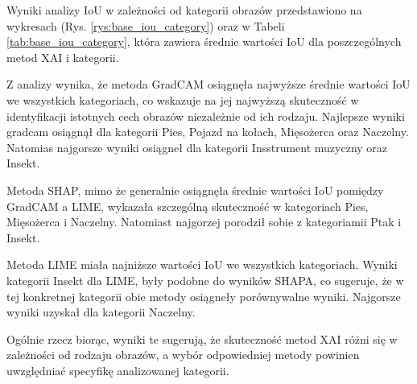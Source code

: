 Wyniki analizy IoU w zależności od kategorii obrazów przedstawiono na wykresach (Rys. \ref{rys:base_iou_category}) oraz w Tabeli \ref{tab:base_iou_category}, która zawiera średnie wartości IoU dla poszczególnych metod XAI i kategorii.

Z analizy wynika, że metoda GradCAM osiągnęła najwyższe średnie wartości IoU we wszystkich kategoriach, co wskazuje na jej najwyższą skuteczność w identyfikacji istotnych cech obrazów niezależnie od ich rodzaju.
Najlepsze wyniki gradcam osiągnął dla kategorii Pies, Pojazd na kołach, Mięsożerca oraz Naczelny.
Natomias najgorsze wyniki osiągneł dla kategorii Insstrument muzyczny oraz Insekt.

Metoda SHAP, mimo że generalnie osiągnęła średnie wartości IoU pomiędzy GradCAM a LIME, wykazała szczególną skuteczność w kategoriach Pies, Mięsożerca i Naczelny.
Natomiast najgorzej porodził sobie z kategoriamii Ptak i Insekt.

Metoda LIME miała najniższe wartości IoU we wszystkich kategoriach.
Wyniki kategorii Insekt dla LIME, były podobne do wyników SHAPA, co sugeruje, że w tej konkretnej kategorii obie metody osiągneły porównywalne wyniki.
Najgorsze wyniki uzyskał dla kategorii Naczelny.

Ogólnie rzecz biorąc, wyniki te sugerują, że skuteczność metod XAI różni się w zależności od rodzaju obrazów, a wybór odpowiedniej metody powinien uwzględniać specyfikę analizowanej kategorii.

